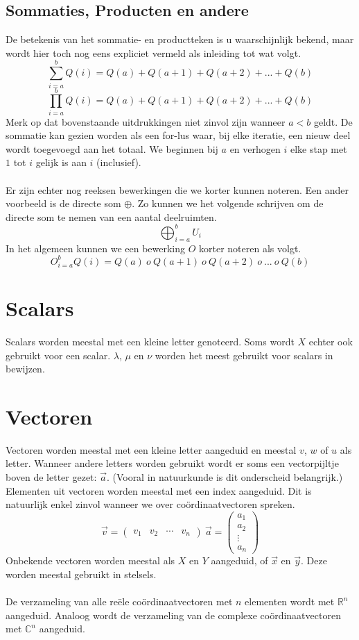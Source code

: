 \documentclass[lineaire_algebra_oplossingen.tex]{subfiles}
\begin{document}
\subsection{Sommaties, Producten en andere}
De betekenis van het sommatie- en productteken is u waarschijnlijk bekend, maar wordt hier toch nog eens expliciet vermeld als inleiding tot wat volgt. 
\[
\sum_{i=a}^bQ(i) = Q(a) + Q(a+1)+ Q(a+2) + ... + Q(b) 
\]
\[
\prod_{i=a}^bQ(i) = Q(a) + Q(a+1)+ Q(a+2) + ... + Q(b) 
\]
Merk op dat bovenstaande uitdrukkingen niet zinvol zijn wanneer $a < b$ geldt.
De sommatie kan gezien worden als een for-lus waar, bij elke iteratie, een nieuw deel wordt toegevoegd aan het totaal.
We beginnen bij $a$ en verhogen $i$ elke stap met $1$ tot $i$ gelijk is aan $i$ (inclusief).\\\\
Er zijn echter nog reeksen bewerkingen die we korter kunnen noteren. 
Een ander voorbeeld is de directe som $\oplus$. Zo kunnen we het volgende schrijven om de directe som te nemen van een aantal deelruimten.
\[
\bigoplus_{i=a}^bU_i
\]
In het algemeen kunnen we een bewerking $O$ korter noteren als volgt.
\[
O_{i=a}^bQ(i) = Q(a)\ o\ Q(a+1)\ o\ Q(a+2)\ o\ ...\ o\ Q(b) 
\]

\section{Scalars}
Scalars worden meestal met een kleine letter genoteerd. Soms wordt $X$ echter ook gebruikt voor een scalar. $\lambda$, $\mu$ en $\nu$ worden het meest gebruikt voor scalars in bewijzen.

\section{Vectoren}
Vectoren worden meestal met een kleine letter aangeduid en meestal $v$, $w$ of $u$ als letter.
Wanneer andere letters worden gebruikt wordt er soms een vectorpijltje boven de letter gezet: $\vec{a}$. (Vooral in natuurkunde is dit onderscheid belangrijk.)
Elementen uit vectoren worden meestal met een index aangeduid. Dit is natuurlijk enkel zinvol wanneer we over co\"ordinaatvectoren spreken.
\[
\vec{v} = 
\begin{pmatrix}
v_{1}&v_{2}&\cdots&v_{n}
\end{pmatrix}
\ 
\vec{a} = 
\begin{pmatrix}
a_{1}\\a_{2}\\\vdots\\a_{n}
\end{pmatrix}
\]
Onbekende vectoren worden meestal als $X$ en $Y$ aangeduid, of $\vec{x}$ en $\vec{y}$. Deze worden meestal gebruikt in stelsels.\\\\
De verzameling van alle re\"ele co\"ordinaatvectoren met $n$ elementen wordt met $\mathbb{R}^n$ aangeduid. Analoog wordt de verzameling van de complexe co\"ordinaatvectoren met $\mathbb{C}^n$ aangeduid.
\end{document}
